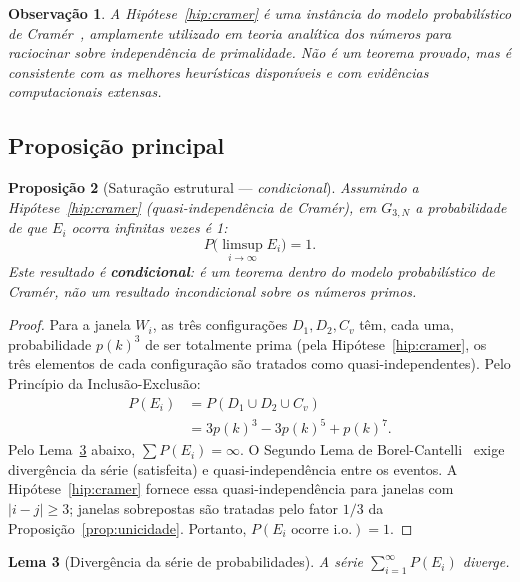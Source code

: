 \documentclass{article}
\newtheorem{proposition}{Proposição}[section]
\newtheorem{lemma}[proposition]{Lema}
\newtheorem{remark}[proposition]{Observação}
\begin{document}
	\begin{remark}
		A Hipótese~\ref{hip:cramer} é uma instância do modelo probabilístico
		de Cramér~\cite{cramer1936}, amplamente utilizado em teoria analítica
		dos números para raciocinar sobre independência de primalidade.
		Não é um teorema provado, mas é consistente com as melhores heurísticas
		disponíveis e com evidências computacionais extensas.
	\end{remark}
	
	\subsection{Proposição principal}
	
	\begin{proposition}[Saturação estrutural --- \emph{condicional}]
		\label{prop:principal}
		\emph{Assumindo} a Hipótese~\ref{hip:cramer} (quasi-independência
		de Cramér), em $G_{3,N}$ a probabilidade de que $E_i$ ocorra
		infinitas vezes é 1:
		\[
		P\!\bigl(\limsup_{i\to\infty} E_i\bigr) = 1.
		\]
		Este resultado é \textbf{condicional}: é um teorema dentro do
		modelo probabilístico de Cramér, não um resultado incondicional
		sobre os números primos.
	\end{proposition}
	
	\begin{proof}
		Para a janela $W_i$, as três configurações $D_1, D_2, C_v$ têm,
		cada uma, probabilidade $p(k)^3$ de ser totalmente prima
		(pela Hipótese~\ref{hip:cramer}, os três elementos de cada
		configuração são tratados como quasi-independentes). Pelo
		Princípio da Inclusão-Exclusão:
		\begin{align*}
			P(E_i)
			&= P(D_1 \cup D_2 \cup C_v) \\
			&= 3p(k)^3 - 3p(k)^5 + p(k)^7.
		\end{align*}
		Pelo Lema~\ref{lem:divergencia} abaixo, $\sum P(E_i) = \infty$.
		O Segundo Lema de Borel-Cantelli~\cite{durrett2019} exige
		divergência da série (satisfeita) e quasi-independência entre
		os eventos. A Hipótese~\ref{hip:cramer} fornece essa
		quasi-independência para janelas com $|i-j|\geq 3$;
		janelas sobrepostas são tratadas pelo fator $1/3$
		da Proposição~\ref{prop:unicidade}.
		Portanto, $P(E_i \text{ ocorre i.o.}) = 1$.
	\end{proof}
	
	\begin{lemma}[Divergência da série de probabilidades]
		\label{lem:divergencia}
		A série $\sum_{i=1}^{\infty} P(E_i)$ diverge.
	\end{lemma}
	
\end{document}

